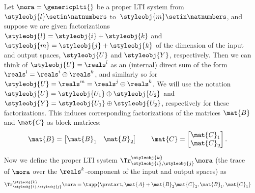 \begin{definition}\label{def:trace-lti-prop}
    Let $\mora = \genericplti{}$ be a proper LTI system from $\styleobj{l}\setin \natnumbers$ to~$\styleobj{m}\setin \natnumbers$, and suppose we are given factorizations $\styleobj{l} = \styleobj{i} + \styleobj{k}$ and $\styleobj{m} = \styleobj{j} + \styleobj{k}$ of the dimension of the input and output spaces, $\styleobj{U}$ and $\styleobj{Y}$, respectively. Then we can think of $\styleobj{U} = \reals^l$ as an (internal) direct sum of the form $\reals^l = \reals^i \oplus \reals^k$, and similarly so for $\styleobj{U} = \reals^m = \reals^j \oplus \reals^k$. We will use the notation $\styleobj{U} = \styleobj{U_1} \oplus \styleobj{U_2}$ and $\styleobj{Y} = \styleobj{U_1} \oplus \styleobj{U_2}$, respectively for these factorizations. This induces corresponding factorizations of the matrices $\mat{B}$ and $\mat{C}$ as block matrices: 
    \begin{equation}
\mat{B} = 
\begin{bmatrix}
\mat{B}_1 & \mat{B}_2
\end{bmatrix}
\qquad 
\mat{C} = 
\begin{bmatrix}
\mat{C}_1 \\
\mat{C}_2
\end{bmatrix}.
\end{equation}

   
 Now we define the proper LTI system $\Tr_{\styleobj{i},\styleobj{j}}^{\styleobj{k}}\mora$ (the trace of $\mora$ over the $\reals^k$-component of the input and output spaces) as
   \begin{equation}
        \Tr_{\styleobj{i},\styleobj{j}}^{\styleobj{k}}\mora = \tupp{\prstart,\mat{A} + \mat{B}_2 \mat{C}_2, \mat{B}_1,\mat{C}_1}
    \end{equation}
% 
\end{definition}



